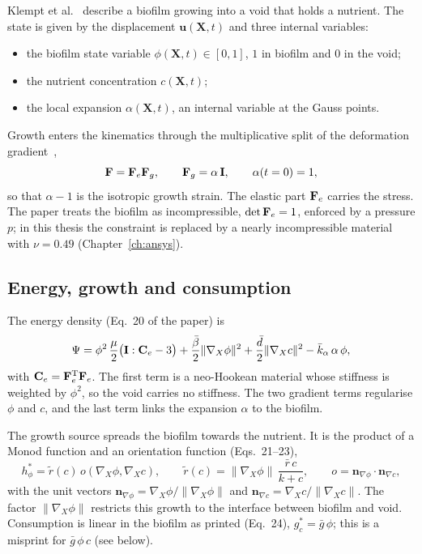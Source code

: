 Klempt et al.~\cite{Klempt2024DiffusionDrivenGrowth} describe a biofilm growing
into a void that holds a nutrient. The state is given by the displacement
$\mathbf u(\mathbf X,t)$ and three internal variables:
\begin{itemize}
  \item the biofilm state variable $\phi(\mathbf X,t)\in[0,1]$, $1$ in biofilm
        and $0$ in the void;
  \item the nutrient concentration $c(\mathbf X,t)$;
  \item the local expansion $\alpha(\mathbf X,t)$, an internal variable at the
        Gauss points.
\end{itemize}
Growth enters the kinematics through the multiplicative split of the
deformation gradient~\cite{Rodriguez1994Growth},
\begin{equation}
  \mathbf{F}=\mathbf{F}_e\mathbf{F}_g,\qquad \mathbf{F}_g=\alpha\,\mathbf{I},\qquad \alpha(t=0)=1,
  \label{eq:theory_split}
\end{equation}
so that $\alpha-1$ is the isotropic growth strain. The elastic part $\mathbf{F}_e$
carries the stress. The paper treats the biofilm as incompressible,
$\det\mathbf{F}_e=1$, enforced by a pressure $p$; in this thesis the constraint is
replaced by a nearly incompressible material with $\nu=0.49$
(Chapter~\ref{ch:ansys}).

\subsection{Energy, growth and consumption}

The energy density (Eq.~20 of the paper) is
\begin{equation}
  \Psi=\phi^2\,\frac{\mu}{2}\bigl(\mathbf{I}:\mathbf C_e-3\bigr)
       +\frac{\bar\beta}{2}\|\nabla_X\phi\|^2
       +\frac{\bar d}{2}\|\nabla_X c\|^2
       -\bar k_\alpha\,\alpha\,\phi ,
  \label{eq:theory_energy}
\end{equation}
with $\mathbf C_e=\mathbf{F}_e^{\rm T}\mathbf{F}_e$. The first term is a neo-Hookean
material whose stiffness is weighted by $\phi^2$, so the void carries no
stiffness. The two gradient terms regularise $\phi$ and $c$, and the last term
links the expansion $\alpha$ to the biofilm.

The growth source spreads the biofilm towards the nutrient. It is the product of
a Monod function and an orientation function (Eqs.~21--23),
\begin{equation}
  h^*_\phi=\tilde r(c)\,o(\nabla_X\phi,\nabla_X c),\qquad
  \tilde r(c)=\|\nabla_X\phi\|\,\frac{\bar r\,c}{k+c},\qquad
  o=\mathbf n_{\nabla\phi}\cdot\mathbf n_{\nabla c},
  \label{eq:theory_growth}
\end{equation}
with the unit vectors $\mathbf n_{\nabla\phi}=\nabla_X\phi/\|\nabla_X\phi\|$
and $\mathbf n_{\nabla c}=\nabla_X c/\|\nabla_X c\|$. The factor
$\|\nabla_X\phi\|$ restricts this growth to the interface between biofilm and
void. Consumption is linear in the biofilm as printed (Eq.~24),
$g^*_c=\bar g\,\phi$; this is a misprint for $\bar g\,\phi\,c$ (see below).

